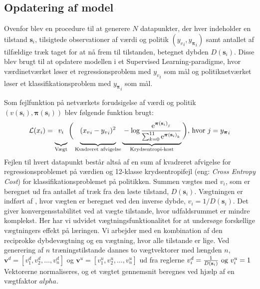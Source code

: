 \documentclass[../main.tex]{subfiles}
\begin{document}
\subsection*{Opdatering af model}
Ovenfor blev en procedure til at generere \(N\) datapunkter, der hver indeholder en tilstand \(\mathbf s_i\), tilsigtede observationer af værdi og politik \(\left({y_{v}}_i, {y_{\bm \pi }}_i \right)\) samt antallet af tilfældige træk taget for at nå frem til tilstanden, betegnet dybden \(D(\mathbf s_i)\).
Disse blev  brugt til at opdatere modellen i et Supervised Learning-paradigme, hvor værdinetværket løser et regressionsproblem med \({y_{v}}_i\) som mål og politiknetværket løser et klassifikationsproblem med \({y_{\bm \pi }}_i\) som mål. 

Som fejlfunktion på netværkets forudsigelse af værdi og politik
\(\left(v(\mathbf s_i), \bm \pi (\mathbf s_i)\right)\)
blev følgende funktion brugt:
\begin{equation}\label{eq:loss}
	\mathcal L(x_i) =
	\underbrace{\vphantom{\sum_{i}}
		v_i
	}
	_{\mathclap{
		\text{Vægt}
		}	
 }
	 \bigg(
		\underbrace{\vphantom{\sum_{i}}
		({x_{v}}_i-{y_{v}}_i )^2
		}
		_{\text{Kvadreret afvigelse}}	
			\underbrace{\vphantom{\sum_{i}}
		- 
		\log 
			\frac{
					\eul{{\bm \pi(\mathbf s_i)}_j
				}
				}
				{
					\sum_{k=0}^{11}
					\eul{{\bm \pi(\mathbf s_i)}_k}
				}
			}
			_\text{Krydsentropi-kost}
	\bigg)
	\text{, hvor } j = {y_{\bm \pi }}_i
\end{equation}
Fejlen til hvert datapunkt består altså af en sum af kvadreret afvigelse for regressionsproblemet på værdien og 12-klasse krydsentropifejl (eng: \textit{Cross Entropy Cost}) for klassifikationsproblemet på politikken.
Summen vægtes med \(v_i\), som er beregnet ud fra antallet af træk fra den løste tilstand, $ D(\mathbf s_i) $.
Vægtningen er indført af \cite{HumansBeGone}, hvor vægten er beregnet ved den inverse dybde, $ v_i=1/D(\mathbf s_i) $.
Det giver konvergensstabilitet ved at vægte tilstande, hvor udfaldsrummet er mindre komplekst.
Her har vi udvidet vægtningsfunktionalitet for at undersøge forskellige vægtningers effekt på læringen.
Vi arbejder med en kombination af den reciprokke dybdevægtning og en vægtning, hvor alle tilstande er lige.
Ved generering af $ n $ træningstilstande dannes to vægtvektorer med længden $ n $, $ \mathbf v^d=[v_1^d, v_2^d, \ldots, v_n^d] $ og $ \mathbf v^u=[v_1^u, v_2^u, \ldots, v_n^u] $ ud fra reglerne $v_i^d = \frac{1}{D(\mathbf s_i)} \textup{ og } v_i^u = 1$
Vektorerne normaliseres, og et vægtet gennemsnit beregnes ved hjælp af en vægtfaktor $ alpha $.
\end{document}
